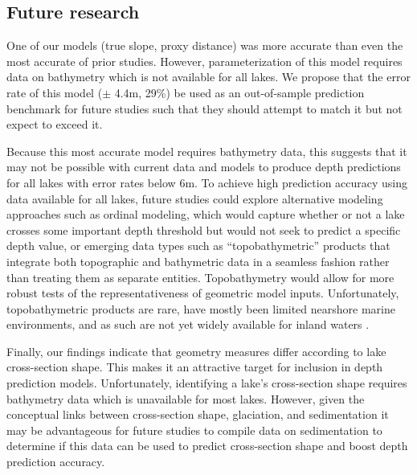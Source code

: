 \documentclass[draft]{agujournal2019}
\begin{document}
\subsection{Future research}
\noindent
One of our models (true slope, proxy distance) was more accurate than even the most accurate of prior studies. However, parameterization of this model requires data on bathymetry which is not available for all lakes. We propose that the error rate of this model ($\pm$ 4.4m, 29\%) be used as an out-of-sample prediction benchmark for future studies such that they should attempt to match it but not expect to exceed it.

Because this most accurate model requires bathymetry data, this suggests that it may not be possible with current data and models to produce depth predictions for all lakes with error rates below 6m. To achieve high prediction accuracy using data available for all lakes, future studies could explore alternative modeling approaches such as ordinal modeling, which would capture whether or not a lake crosses some important depth threshold but would not seek to predict a specific depth value, or emerging data types such as “topobathymetric” products that integrate both topographic and bathymetric data in a seamless fashion rather than treating them as separate entities. Topobathymetry would allow for more robust tests of the representativeness of geometric model inputs. Unfortunately, topobathymetric products are rare, have mostly been limited nearshore marine environments, and as such are not yet widely available for inland waters \cite{danielsonTopobathymetricElevationModel2016}.

Finally, our findings indicate that geometry measures differ according to lake cross-section shape. This makes it an attractive target for inclusion in depth prediction models. Unfortunately, identifying a lake’s cross-section shape requires bathymetry data which is unavailable for most lakes. However, given the conceptual links between cross-section shape, glaciation, and sedimentation \cite{johanssonNewApproachesModelling2007} it may be advantageous for future studies to compile data on sedimentation to determine if this data can be used to predict cross-section shape and boost depth prediction accuracy.
\end{document}
